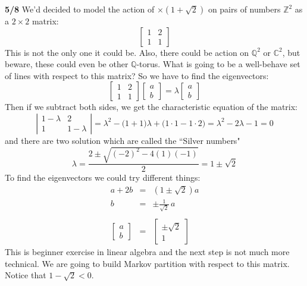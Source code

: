 \documentclass[12pt]{article}
\begin{document}
\newpage

\noindent \textbf{5/8} We'd decided to model the action of $\times (1 + \sqrt{2})$ on pairs of numbers $\mathbb{Z}^2$ as a $2 \times 2$ matrix:
$$ \left[ \begin{array}{cc} 1 & 2 \\ 1 & 1 \end{array} \right] $$
This is not the only one it could be.  Also, there could be action on $\mathbb{Q}^2$ or $\mathbb{C}^2$, but beware, these could even be other $\mathbb{Q}$-torus.  What is going to be a well-behave set of lines with respect to this matrix?  So we have to find the eigenvectors:
$$ \left[ \begin{array}{cc} 1 & 2 \\ 1 & 1 \end{array} \right]
\left[ \begin{array}{c} a \\ b \end{array} \right] 
= \lambda \left[ \begin{array}{c} a \\ b \end{array} \right] $$
Then if we subtract both sides, we get the characteristic equation of the matrix:
$$
 \left| \begin{array}{cc} 1 - \lambda & 2 \\ 1 & 1 - \lambda \end{array} \right|
 = \lambda^2 - \big(1 + 1 \big)\lambda + \big(1 \cdot 1 - 1 \cdot 2 \big)
 = \lambda^2 - 2 \lambda - 1 = 0$$
and there are two solution which are called the ``Silver numbers"
$$ \lambda = \frac{2 \pm \sqrt{(-2)^2 - 4(1)(-1)}}{2} = 1 \pm \sqrt{2} $$
To find the eigenvectors we could try different things:
\begin{eqnarray*} a + 2b &=& (1 \pm \sqrt{2})a \\
 b &=&  \pm\frac{ 1}{\sqrt{2}}\,a \\ \\
 \left[ \begin{array}{c} a \\ b \end{array} \right]  &=& \left[ \begin{array}{r} \pm \sqrt{2} \\ 1 \end{array} \right] 
\end{eqnarray*}
This is beginner exercise in linear algebra and the next step is not much more technical.  We are going to build Markov partition with respect to this matrix.  Notice that $1 - \sqrt{2} < 0$. \\ \\
\end{document}
